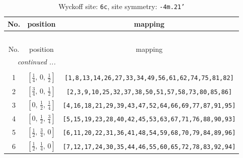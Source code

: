 \documentclass[fleqn,8pt]{jsarticle}
\begin{document}
\begin{longtable}{ccc}
\caption{Wyckoff site: {\tt 6c}, site symmetry: {\tt -4m.21'}}
 \\
 \hline \hline
No. & position & mapping \\ \hline \endfirsthead

\multicolumn{2}{l}{\tablename\ \thetable{}} \\
 \hline \hline
No. & position & mapping \\ \hline \endhead

 \hline \hline
\multicolumn{2}{r}{\footnotesize\it continued ...} \\ \endfoot

 \hline \hline
\multicolumn{2}{r}{} \\ \endlastfoot

1 & $\left[ \frac{1}{4},\, 0,\, \frac{1}{2} \right]$ & {\tt [1,8,13,14,26,27,33,34,49,56,61,62,74,75,81,82]} \\ \hline
2 & $\left[ \frac{3}{4},\, 0,\, \frac{1}{2} \right]$ & {\tt [2,3,9,10,25,32,37,38,50,51,57,58,73,80,85,86]} \\ \hline
3 & $\left[ 0,\, \frac{1}{2},\, \frac{1}{4} \right]$ & {\tt [4,16,18,21,29,39,43,47,52,64,66,69,77,87,91,95]} \\ \hline
4 & $\left[ 0,\, \frac{1}{2},\, \frac{3}{4} \right]$ & {\tt [5,15,19,23,28,40,42,45,53,63,67,71,76,88,90,93]} \\ \hline
5 & $\left[ \frac{1}{2},\, \frac{3}{4},\, 0 \right]$ & {\tt [6,11,20,22,31,36,41,48,54,59,68,70,79,84,89,96]} \\ \hline
6 & $\left[ \frac{1}{2},\, \frac{1}{4},\, 0 \right]$ & {\tt [7,12,17,24,30,35,44,46,55,60,65,72,78,83,92,94]} \\
\end{longtable}
\renewcommand{\arraystretch}{1.2}
\end{document}

